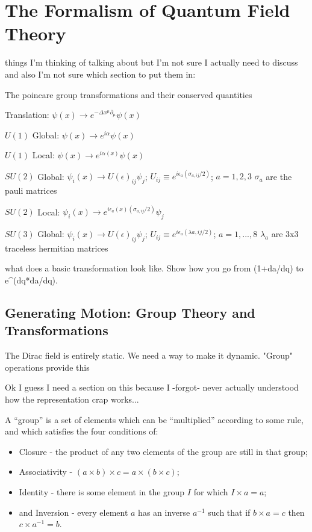 \section{The Formalism of Quantum Field Theory}
    things I'm thinking of talking about but I'm not sure I actually need to discuss and also I'm not sure which section to put them in:

        The poincare group transformations and their conserved quantities
            
            Translation: $\psi(x) \rightarrow e^{-\Delta x^{\mu} \partial_{\mu}} \psi(x)$

            $U(1)$ Global: $\psi(x) \rightarrow e^{i \alpha} \psi(x)$

            $U(1)$ Local: $\psi(x) \rightarrow e^{i \alpha(x)} \psi(x)$

            $SU(2)$ Global:  $\psi_i(x) \rightarrow  U(\epsilon)_{ij} \psi_j$; $U_{ij} \equiv e^{i \epsilon_a (\sigma_{a,ij} / 2)}$; $a=1,2,3$
                $\sigma_a$ are the pauli matrices

            $SU(2)$ Local:  $\psi_i(x) \rightarrow  e^{i \epsilon_a(x) (\sigma_{a,ij} / 2)} \psi_j$

            $SU(3)$ Global:  $\psi_i(x) \rightarrow  U(\epsilon)_{ij} \psi_j$; $U_{ij} \equiv e^{i \epsilon_a (\lambda{a,ij} / 2)}$; $a=1,..., 8$
                $\lambda_a$ are 3x3 traceless hermitian matrices
            

        what does a basic transformation look like. Show how you go from (1+da/dq) to e^(dq*da/dq).



    \subsection{Generating Motion: Group Theory and Transformations}

        The Dirac field is entirely static. We need a way to make it dynamic. "Group" operations provide this
        
        Ok I guess I need a section on this because I -forgot- never actually understood how the representation crap works...

        A ``group'' is a set of elements which can be ``multiplied'' according to some rule,
            and which satisfies the four conditions of:
                \begin{itemize}
                    \item Closure - the product of any two elements of the group are still in that group;
                    \item Associativity - $(a \times b)\times c = a\times(b \times c)$;
                    \item Identity - there is some element in the group $I$ for which $I \times a=a$;
                    \item and Inversion - every element $a$ has an inverse $a^{-1}$ such that if $b \times a = c$ then $c \times a^{-1} = b$.
                \end{itemize}

